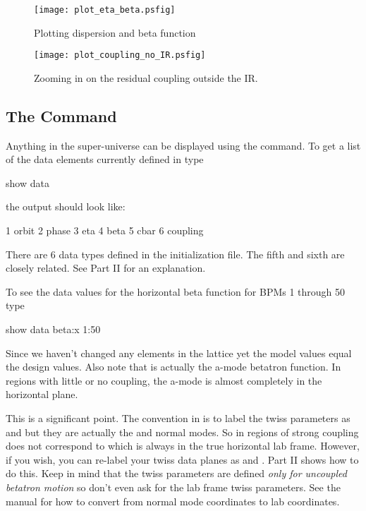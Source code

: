 \begin{figure}
  \centering
  \texttt{[image: plot\_eta\_beta.psfig]}
  \caption{Plotting dispersion and beta function}
  \label{f:plot_eta_beta}
\end{figure}

\begin{figure}
  \centering
  \texttt{[image: plot\_coupling\_no\_IR.psfig]}
  \caption{Zooming in on the residual coupling outside the IR.}
  \label{f:plot_coupling_no_IR}
\end{figure}

\subsection{The  Command}

Anything in the super-universe can be displayed using the  command. To
get a list of the data elements currently defined in \tao type
\begin{example}
  show data
\end{example}
the output should look like:
\begin{example}
   1  orbit
   2  phase
   3  eta
   4  beta
   5  cbar
   6  coupling
\end{example}
There are 6 data types defined in the initialization file. The fifth and sixth are 
closely related. See Part II for an explanation.

To see the data values for the horizontal beta function for \cesr BPMs 1 through
50 type
\begin{example}
  show data beta:x 1:50
\end{example}
Since we haven't changed any elements in the lattice yet the model values equal
the design values. Also note that  is actually the a-mode betatron
function. In regions with little or no coupling, the a-mode is almost completely
in the horizontal plane.
 
This is a significant point. The convention in \bmad is to label the twiss
parameters as  and  but they are actually the  and 
normal modes. So
in regions of strong coupling  does not correspond to 
which is always in the true horizontal lab frame. 
However, if you wish, you can re-label your twiss data planes as  and
. Part II shows how to do this. Keep in mind that the twiss
parameters are defined \textit{only for uncoupled betatron motion} so don't even ask for the lab
frame twiss parameters. See the \bmad manual for how to convert
from normal mode coordinates to lab coordinates.

